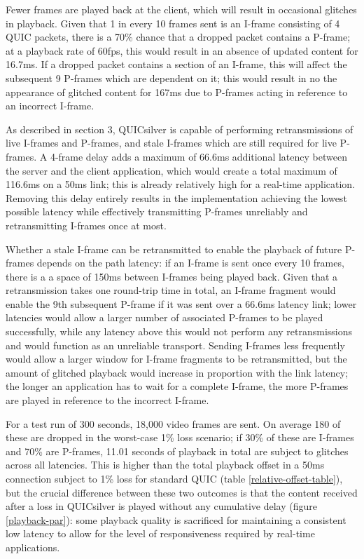 \documentclass{mpaper}
\begin{document}
Fewer frames are played back at the client, which will result in occasional glitches in playback. Given that 1 in every 10 frames sent is an I-frame consisting of 4 QUIC packets, there is a 70\% chance that a dropped packet contains a P-frame; at a playback rate of 60fps, this would result in an absence of updated content for 16.7ms. If a dropped packet contains a section of an I-frame, this will affect the subsequent 9 P-frames which are dependent on it; this would result in no the appearance of glitched content for 167ms due to P-frames acting in reference to an incorrect I-frame.


As described in section 3, QUICsilver is capable of performing retransmissions of live I-frames and P-frames, and stale I-frames which are still required for live P-frames. A 4-frame delay adds a maximum of 66.6ms additional latency between the server and the client application, which would create a total maximum of 116.6ms on a 50ms link; this is already relatively high for a real-time application. Removing this delay entirely results in the implementation achieving the lowest possible latency while effectively transmitting P-frames unreliably and retransmitting I-frames once at most.


Whether a stale I-frame can be retransmitted to enable the playback of future P-frames depends on the path latency: if an I-frame is sent once every 10 frames, there is a a space of 150ms between I-frames being played back. Given that a retransmission takes one round-trip time in total, an I-frame fragment would enable the 9th subsequent P-frame if it was sent over a 66.6ms latency link; lower latencies would allow a larger number of associated P-frames to be played successfully, while any latency above this would not perform any retransmissions and would function as an unreliable transport. Sending I-frames less frequently would allow a larger window for I-frame fragments to be retransmitted, but the amount of glitched playback would increase in proportion with the link latency; the longer an application has to wait for a complete I-frame, the more P-frames are played in reference to the incorrect I-frame.


For a test run of 300 seconds, 18,000 video frames are sent. On average 180 of these are dropped in the worst-case 1\% loss scenario; if 30\% of these are I-frames and 70\% are P-frames, 11.01 seconds of playback in total are subject to glitches across all latencies. This is higher than the total playback offset in a 50ms connection subject to 1\% loss for standard QUIC (table \ref{relative-offset-table}), but the crucial difference between these two outcomes is that the content received after a loss in QUICsilver is played without any cumulative delay (figure \ref{playback-par}): some playback quality is sacrificed for maintaining a consistent low latency to allow for the level of responsiveness required by real-time applications.
\end{document}
